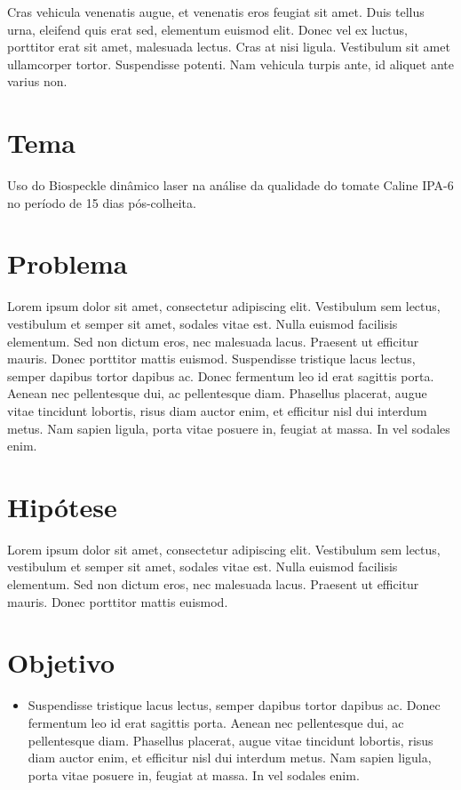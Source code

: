 Cras vehicula venenatis augue, et venenatis eros feugiat sit amet. Duis tellus urna, eleifend quis erat sed, elementum euismod elit. Donec vel ex luctus, porttitor erat sit amet, malesuada lectus. Cras at nisi ligula. Vestibulum sit amet ullamcorper tortor. Suspendisse potenti. Nam vehicula turpis ante, id aliquet ante varius non.

\section{Tema}
Uso do Biospeckle dinâmico laser na análise da qualidade do tomate Caline IPA-6 no período de 15 dias pós-colheita.



\section{Problema}


Lorem ipsum dolor sit amet, consectetur adipiscing elit. Vestibulum sem lectus, vestibulum et semper sit amet, sodales vitae est. Nulla euismod facilisis elementum. Sed non dictum eros, nec malesuada lacus. Praesent ut efficitur mauris. Donec porttitor mattis euismod. Suspendisse tristique lacus lectus, semper dapibus tortor dapibus ac. Donec fermentum leo id erat sagittis porta. Aenean nec pellentesque dui, ac pellentesque diam. Phasellus placerat, augue vitae tincidunt lobortis, risus diam auctor enim, et efficitur nisl dui interdum metus. Nam sapien ligula, porta vitae posuere in, feugiat at massa. In vel sodales enim.

\section{Hipótese}


Lorem ipsum dolor sit amet, consectetur adipiscing elit. Vestibulum sem lectus, vestibulum et semper sit amet, sodales vitae est. Nulla euismod facilisis elementum. Sed non dictum eros, nec malesuada lacus. Praesent ut efficitur mauris. Donec porttitor mattis euismod.

\section{Objetivo}
\begin{itemize}

\item { Suspendisse tristique lacus lectus, semper dapibus tortor dapibus ac. Donec fermentum leo id erat sagittis porta. Aenean nec pellentesque dui, ac pellentesque diam. Phasellus placerat, augue vitae tincidunt lobortis, risus diam auctor enim, et efficitur nisl dui interdum metus. Nam sapien ligula, porta vitae posuere in, feugiat at massa. In vel sodales enim.} 
\end{itemize}


